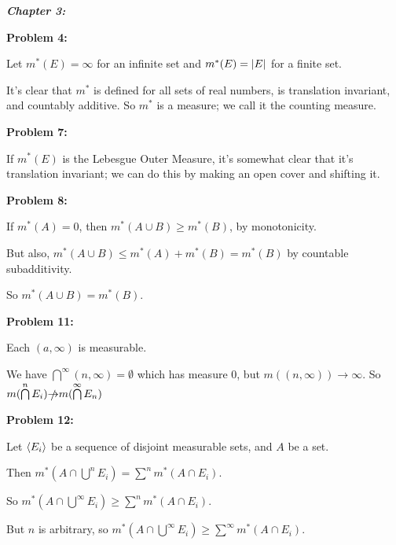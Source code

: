 \documentclass[a4paper,12pt]{article}
\begin{document}


{\Huge{\textit{\textbf{Chapter 3:}}}}

\shunt

{\bf Problem 4:}

Let $m^*(E) = \infty$ for an infinite set and $m^*(E) = \left\lvert E \right\rvert$ for a finite set.

It's clear that $m^*$ is defined for all sets of real numbers, is translation invariant, and countably additive. So $m^*$ is a measure; we call it the counting measure.

\shunt

{\bf Problem 7:}

If $m^*(E)$ is the Lebesgue Outer Measure, it's somewhat clear that it's translation invariant; we can do this by making an open cover and shifting it.

\shunt

{\bf Problem 8:}

If $m^*(A) = 0$, then $m^*(A \cup B) \geq m^*(B)$, by monotonicity.

But also, $m^*(A \cup B) \leq m^*(A) + m^*(B) = m^*(B)$ by countable subadditivity. 

So $m^*(A \cup B) = m^*(B)$.

\shunt

{\bf Problem 11:}

Each $(a, \infty)$ is measurable.

We have $\bigcap\limits^\infty (n, \infty) = \emptyset$ which has measure $0$, but $m((n, \infty)) \to \infty$. So $m(\bigcap\limits^n E_i) \slashed{\to} m(\bigcap\limits^\infty E_n)$

\shunt

{\bf Problem 12:}

Let $\left\langle E_i \right\rangle$ be a sequence of disjoint measurable sets, and $A$ be a set.

Then $m^*(A \cap \bigcup\limits^n E_i) = \sum\limits^n m^*(A \cap E_i)$.

So $m^*(A \cap \bigcup\limits^\infty E_i) \geq \sum\limits^n m^*(A \cap E_i)$.

But $n$ is arbitrary, so $m^*(A \cap \bigcup\limits^\infty E_i) \geq \sum\limits^\infty m^*(A \cap E_i)$.
\end{document}
